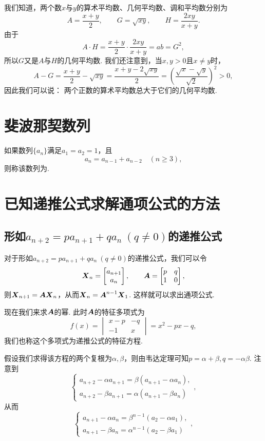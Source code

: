 我们知道，两个数\(x\)与\(y\)的算术平均数、几何平均数、调和平均数分别为\[
    A = \frac{x+y}{2}, \qquad
    G = \sqrt{xy}, \qquad
    H = \frac{2xy}{x+y}.
\]
由于\[
    A \cdot H = \frac{x+y}{2} \cdot \frac{2xy}{x+y}
    = ab = G^2,
\]
所以\(G\)又是\(A\)与\(H\)的几何平均数.
我们还注意到，当\(x,y>0\)且\(x \neq y\)时，\[
    A - G = \frac{x+y}{2} - \sqrt{xy}
    = \frac{x+y-2\sqrt{xy}}{2}
    = \left(\frac{\sqrt{x}-\sqrt{y}}{\sqrt{2}}\right)^2
    > 0,
\]
因此我们可以说：
两个正数的算术平均数总大于它们的几何平均数.

\section{斐波那契数列}
如果数列\(\{a_n\}\)满足\(a_1=a_2=1\)，且\[
a_n = a_{n-1} + a_{n-2} \quad(n\geqslant3),
\]则称该数列为.

\section{已知递推公式求解通项公式的方法}
\subsection{\texorpdfstring{形如\(a_{n+2}=p a_{n+1} + q a_n\ (q\neq0)\)的递推公式}{第一类递推公式}}
对于形如\(a_{n+2}=p a_{n+1} + q a_n\ (q\neq0)\)的递推公式，我们可以令\[
\boldsymbol{X}_n = \begin{bmatrix}
a_{n+1} \\
a_n
\end{bmatrix},
\qquad
\boldsymbol{A} = \begin{bmatrix}
p & q \\
1 & 0
\end{bmatrix},
\]则\(\boldsymbol{X}_{n+1} = \boldsymbol{A} \boldsymbol{X}_n\)，从而\(\boldsymbol{X}_n = \boldsymbol{A}^{n-1} \boldsymbol{X}_1\).
这样就可以求出通项公式.

现在我们来求\(\boldsymbol{A}\)的幂.
此时\(\boldsymbol{A}\)的特征多项式为\[
f(x) = \begin{vmatrix}
x-p & -q \\
-1 & x
\end{vmatrix} = x^2 - px - q,
\]我们也称这个多项式为递推公式的特征方程.

假设我们求得该方程的两个复根为\(\alpha,\beta\)，则由韦达定理可知\(p=\alpha+\beta, q=-\alpha\beta\).
注意到\[
\left\{ \begin{array}{l}
a_{n+2} - \alpha a_{n+1} = \beta(a_{n+1}-\alpha a_n), \\
a_{n+2} - \beta a_{n+1} = \alpha(a_{n+1}-\beta a_n)
\end{array} \right.,
\]从而\[
\left\{ \begin{array}{l}
a_{n+1} - \alpha a_n = \beta^{n-1} (a_2 - \alpha a_1), \\
a_{n+1} - \beta a_n = \alpha^{n-1} (a_2 - \beta a_1)
\end{array} \right.,
\]

